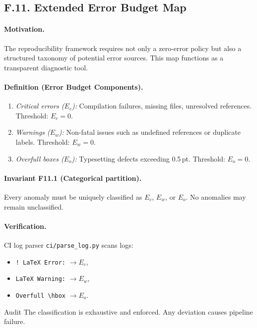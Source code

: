 \subsection*{F.11. Extended Error Budget Map}

\paragraph{Motivation.}
The reproducibility framework requires not only a zero-error policy but
also a structured taxonomy of potential error sources. This map functions
as a transparent diagnostic tool.

\paragraph{Definition (Error Budget Components).}
\begin{enumerate}
  \item \emph{Critical errors ($E_c$):} Compilation failures, missing
        files, unresolved references. Threshold: $E_c=0$.
  \item \emph{Warnings ($E_w$):} Non-fatal issues such as undefined
        references or duplicate labels. Threshold: $E_w=0$.
  \item \emph{Overfull boxes ($E_o$):} Typesetting defects exceeding
        0.5\,pt. Threshold: $E_o=0$.
\end{enumerate}

\paragraph{Invariant F11.1 (Categorical partition).}
Every anomaly must be uniquely classified as $E_c$, $E_w$, or $E_o$.
No anomalies may remain unclassified.

\paragraph{Verification.}
CI log parser \texttt{ci/parse\_log.py} scans logs:
\begin{itemize}
  \item \texttt{! LaTeX Error:} $\to E_c$,
  \item \texttt{LaTeX Warning:} $\to E_w$,
  \item \verb|Overfull \hbox| $\to E_o$.
\end{itemize}

\begin{auditblock}{Audit}
The classification is exhaustive and enforced. Any deviation causes
pipeline failure.
\end{auditblock}

